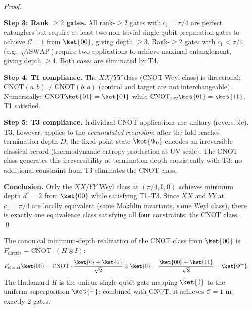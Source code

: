 \begin{proof}
\begin{itemize}
\end{itemize}

\medskip
\noindent\textbf{Step 3: Rank $\geq 2$ gates.}
All rank-$\geq 2$ gates with $c_1 = \pi/4$ are perfect entanglers
but require at least two non-trivial single-qubit preparation gates
to achieve $\mathcal{C}=1$ from $\ket{00}$, giving depth $\geq 3$.
Rank-$\geq 2$ gates with $c_1 < \pi/4$ (e.g., $\sqrt{i\mathrm{SWAP}}$)
require two applications to achieve maximal entanglement, giving
depth $\geq 4$. Both cases are eliminated by T4.

\medskip
\noindent\textbf{Step 4: T1 compliance.}
The $XX$/$YY$ class (CNOT Weyl class) is directional:
$\mathrm{CNOT}(a, b) \neq \mathrm{CNOT}(b, a)$ (control and target
are not interchangeable). Numerically: $\mathrm{CNOT}\ket{01} = \ket{01}$
while $\mathrm{CNOT}_{\mathrm{rev}}\ket{01} = \ket{11}$. T1 satisfied.

\medskip
\noindent\textbf{Step 5: T3 compliance.}
Individual CNOT applications are unitary (reversible). T3, however,
applies to the \emph{accumulated recursion}: after the fold reaches
termination depth $D$, the fixed-point state $\ket{\Psi_0}$ encodes
an irreversible classical record (thermodynamic entropy production at
UV scale). The CNOT class generates this irreversibility at termination
depth consistently with T3; no additional constraint from T3 eliminates
the CNOT class.

\medskip
\noindent\textbf{Conclusion.}
Only the $XX$/$YY$ Weyl class at $(\pi/4, 0, 0)$ achieves
minimum depth $d^* = 2$ from $\ket{00}$ while satisfying T1--T3.
Since $XX$ and $YY$ at $c_1 = \pi/4$ are locally equivalent
(same Makhlin invariants, same Weyl class), there is exactly one
equivalence class satisfying all four constraints: the CNOT class.
\qed
\end{proof}

\begin{corollary}
\label{cor:H_CNOT}
The canonical minimum-depth realization of the CNOT class from
$\ket{00}$ is $F_{\mathrm{circuit}} = \mathrm{CNOT} \cdot (H \otimes I)$:
\begin{equation}
    F_{\mathrm{circuit}}\ket{00}
    = \mathrm{CNOT}\cdot\frac{\ket{0}+\ket{1}}{\sqrt{2}}\otimes\ket{0}
    = \frac{\ket{00}+\ket{11}}{\sqrt{2}}
    = \ket{\Phi^+}.
    \label{eq:canonical_form}
\end{equation}
The Hadamard $H$ is the unique single-qubit gate mapping $\ket{0}$
to the uniform superposition $\ket{+}$; combined with CNOT, it
achieves $\mathcal{C} = 1$ in exactly 2 gates.
\end{corollary}

